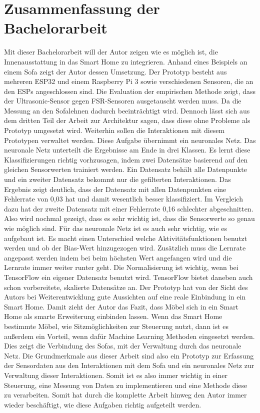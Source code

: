 \section{Zusammenfassung der Bachelorarbeit}
Mit dieser Bachelorarbeit will der Autor zeigen wie es möglich ist, die Innenausstattung in das Smart Home zu integrieren. Anhand eines Beispiels an einem Sofa zeigt der Autor dessen Umsetzung. Der Prototyp besteht aus mehreren ESP32 und einem Raspberry Pi 3 sowie verschiedenen Sensoren, die an den ESPs angeschlossen sind. Die Evaluation der empirischen Methode zeigt, dass der Ultrasonic-Sensor gegen FSR-Sensoren ausgetauscht werden muss. Da die Messung an den Sofalehnen dadurch beeinträchtigt wird. Dennoch lässt sich aus dem dritten Teil der Arbeit zur Architektur sagen, dass diese ohne Probleme als Prototyp umgesetzt wird.
\newline
\newline
Weiterhin sollen die Interaktionen mit diesem Prototypen verwaltet werden. Diese Aufgabe übernimmt ein neuronales Netz. Das neuronale Netz unterteilt die Ergebnisse am Ende in drei Klassen. Es lernt diese Klassifizierungen richtig vorhzusagen, indem zwei Datensätze basierend auf den gleichen Sensorwerten trainiert werden. Ein Datensatz behält alle Datenpunkte und ein zweiter Datensatz bekommt nur die gefilterten Interaktionen. Das Ergebnis zeigt deutlich, dass der Datensatz mit allen Datenpunkten eine Fehlerrate von 0,03 hat und damit wesentlich besser klassifiziert. Im Vergleich dazu hat der zweite Datensatz mit einer Fehlerrate 0,16 schlechter abgeschnitten. Also wird nochmal gezeigt, dass es sehr wichtig ist, dass die Sensorwerte so genau wie möglich sind. 
\newline
Für das neuronale Netz ist es auch sehr wichtig, wie es aufgebaut ist. Es macht einen Unterschied welche Aktivitätsfunktionen benutzt werden und ob der Bias-Wert hinzugezogen wird. Zusätzlich muss die Lernrate angepasst werden indem bei beim höchsten Wert angefangen wird und die Lernrate immer weiter runter geht. Die Normalisierung ist wichtig, wenn bei TensorFlow ein eigener Datensatz benutzt wird. TensorFlow bietet daneben auch schon vorbereitete, skalierte Datensätze an. 
\newline
\newline
Der Prototyp hat von der Sicht des Autors bei Weiterentwicklung gute Aussichten auf eine reale Einbindung in ein Smart Home. Damit zieht der Autor das Fazit, dass Möbel sich in ein Smart Home als smarte Erweiterung einbinden lassen. Wenn das Smart Home bestimmte Möbel, wie Sitzmöglichkeiten zur Steuerung nutzt, dann ist es außerdem ein Vorteil, wenn dafür Machine Learning Methoden eingesetzt werden. Dies zeigt die Verbindung des Sofas, mit der Verwaltung durch das neuronale Netz. Die Grundmerkmale aus dieser Arbeit sind also ein Prototyp zur Erfassung der Sensordaten aus den Interaktionen mit dem Sofa und ein neuronales Netz zur Verwaltung dieser Interaktionen. Somit ist es also immer wichtig in einer Steuerung, eine Messung von Daten zu implementieren und eine Methode diese zu verarbeiten. Somit hat durch die komplette Arbeit hinweg den Autor immer wieder beschäftigt, wie diese Aufgaben richtig aufgeteilt werden. 

